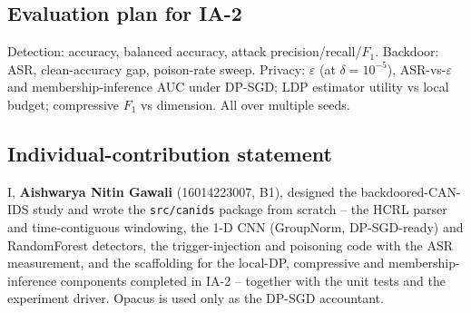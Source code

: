 \documentclass[11pt,a4paper]{article}
\begin{document}
\subsection{Evaluation plan for IA-2}
Detection: accuracy, balanced accuracy, attack precision/recall/$F_1$. Backdoor:
ASR, clean-accuracy gap, poison-rate sweep. Privacy: $\varepsilon$ (at
$\delta=10^{-5}$), ASR-vs-$\varepsilon$ and membership-inference AUC under DP-SGD;
LDP estimator utility vs local budget; compressive $F_1$ vs dimension. All over
multiple seeds.

\subsection{Individual-contribution statement}
\begin{shaded}\small\noindent I, \textbf{Aishwarya Nitin Gawali} (16014223007, B1),
designed the backdoored-CAN-IDS study and wrote the \texttt{src/canids} package
from scratch -- the HCRL parser and time-contiguous windowing, the 1-D CNN
(GroupNorm, DP-SGD-ready) and RandomForest detectors, the trigger-injection and
poisoning code with the ASR measurement, and the scaffolding for the local-DP,
compressive and membership-inference components completed in IA-2 -- together with
the unit tests and the experiment driver. Opacus is used only as the DP-SGD
accountant.\end{shaded}



\end{document}
